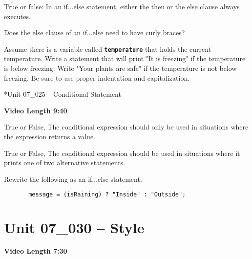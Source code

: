 \documentclass[letterpaper,12pt]{exam}
\newcommand{\unit}{Unit 07}
\begin{document}
\begin{questions}
\begin{samepage}
    \question True or false:  In an if...else statement, either the then or the else clause always executes.
    \vspace{5mm}
\end{samepage}

\begin{samepage}
    \question Does the else clause of an if...else need to have curly braces?
    \vspace{5mm}
\end{samepage}

\begin{samepage}
    \question Assume there is a variable called \texttt{\textbf{temperature}} that holds the current temperature.  Write a statement that will print "It is freezing" if the temperature is below freezing.  Write "Your plants are safe" if the temperature is not below freezing.  Be sure to use proper indentation and capitalization.
    \vspace{5mm}
\end{samepage}


*{\unit\_025 -- Conditional Statement} %
\par{\selectfont\textbf{Video Length 9:40}}

\begin{samepage}
    \question True or False, The conditional expression should only be used in situations where the expression returns a value.
    \vspace{5mm}
\end{samepage}

\begin{samepage}
    \question True or False, The conditional expression should be used in situations where it prints one of two alternative statements.
    \vspace{5mm}
\end{samepage}

\begin{samepage}
    \question Rewrite the following as an if...else statement.
    \begin{verbatim}
       message = (isRaining) ? "Inside" : "Outside";
    \end{verbatim}
    \vspace{35mm}
\end{samepage}

\section*{\unit\_030 -- Style} %
\noindent \textbf{Video Length 7:30}



\end{questions}
\end{document}
